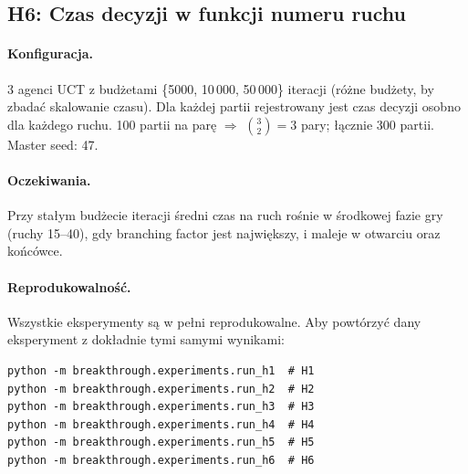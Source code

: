 \subsection{H6: Czas decyzji w funkcji numeru ruchu}

\paragraph{Konfiguracja.}
3 agenci UCT z budżetami \{5000, 10\,000, 50\,000\} iteracji (różne budżety,
by zbadać skalowanie czasu). Dla każdej partii rejestrowany jest czas decyzji
osobno dla każdego ruchu. 100 partii na parę $\Rightarrow$ $\binom{3}{2} = 3$
pary; łącznie 300 partii. Master seed: 47.

\paragraph{Oczekiwania.}
Przy stałym budżecie iteracji średni czas na ruch rośnie w środkowej fazie
gry (ruchy 15--40), gdy branching factor jest największy, i maleje w otwarciu
oraz końcówce.


\paragraph{Reprodukowalność.}
Wszystkie eksperymenty są w pełni reprodukowalne. Aby powtórzyć dany
eksperyment z dokładnie tymi samymi wynikami:
\begin{verbatim}
python -m breakthrough.experiments.run_h1  # H1
python -m breakthrough.experiments.run_h2  # H2
python -m breakthrough.experiments.run_h3  # H3
python -m breakthrough.experiments.run_h4  # H4
python -m breakthrough.experiments.run_h5  # H5
python -m breakthrough.experiments.run_h6  # H6
\end{verbatim}

